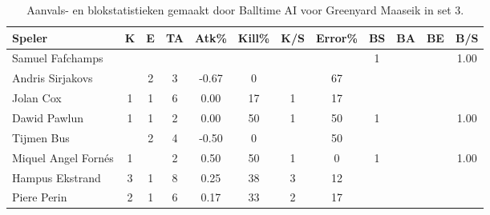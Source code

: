 \begin{table}[ht!]
  \centering
  \scriptsize
  \begin{tabular}{|l|c|c|c|c|c|c|c|c|c|c|c|} \hline
    \textbf{Speler} &  K & E & TA & Atk\% & Kill\% & K/S & Error\% & BS & BA & BE & B/S \\ \hline
    Samuel Fafchamps &   &   &   &   &   &   &   & 1 &  & & 1.00 \\
    Andris Sirjakovs &  & 2 & 3 & -0.67 & 0 &  & 67 &   &  &  & \\
    Jolan Cox & 1 & 1 & 6 & 0.00 & 17 & 1 & 17 &  &  &  & \\
    Dawid Pawlun & 1 & 1 & 2 & 0.00 & 50 & 1 & 50 & 1 &  &  & 1.00 \\
    Tijmen Bus &  & 2 & 4 & -0.50 & 0 &  & 50 & &  &  &  \\
    Miquel Angel Fornés & 1 &  & 2 & 0.50 & 50 & 1 & 0 & 1 & & & 1.00 \\
    Hampus Ekstrand & 3 & 1 & 8 & 0.25 & 38 & 3 & 12 &   &   &  & \\
    Piere Perin & 2 & 1 & 6 & 0.17 & 33 & 2 & 17 &  &  & &  \\ \hline
  \end{tabular}
  \caption[Aanvals- en blokstatistieken gemaakt door Balltime AI voor Greenyard Maaseik in set 3]{\label{tab:PL1AttBlockMaaseikAI3}Aanvals- en blokstatistieken gemaakt door Balltime AI voor Greenyard Maaseik in set 3.}
\end{table}
